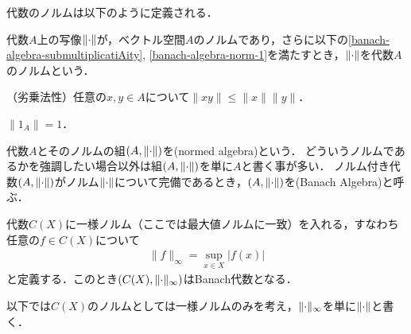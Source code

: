 \documentclass[../main.tex]{subfiles}
\begin{document}
\noindent 代数のノルムは以下のように定義される．

\begin{thmbox}
\begin{definition}
代数\(A\)上の写像\(\lVert\mathord{\cdot}\rVert\)が，ベクトル空間\(A\)のノルムであり，さらに以下の\ref{banach-algebra-submultiplicatiAity}, \ref{banach-algebra-norm-1}を満たすとき，\(\lVert\mathord{\cdot}\rVert\)を代数\(A\)のノルムという．
\begin{conditions}
    \item\label{banach-algebra-submultiplicatiAity}（劣乗法性）任意の\(x, y \in A\)について\(\lVert xy \rVert \leq \lVert x \rVert \lVert y \rVert\)．
    \item\label{banach-algebra-norm-1} \(\lVert 1_A \rVert = 1\)．
\end{conditions}
代数\(A\)とそのノルムの組\((A, \lVert\mathord{\cdot}\rVert)\)を(normed algebra)という．
どういうノルムであるかを強調したい場合以外は組\((A, \lVert \mathord{\cdot} \rVert)\)を単に\(A\)と書く事が多い．
ノルム付き代数\((A, \lVert \mathord{\cdot} \rVert)\)がノルム\(\lVert \mathord{\cdot} \rVert\)について完備であるとき，\((A, \lVert \mathord{\cdot} \rVert)\)を(Banach Algebra)と呼ぶ．
\end{definition}
\end{thmbox}

\begin{thmbox}
\begin{proposition}
代数\(C(X)\)に一様ノルム（ここでは最大値ノルムに一致）を入れる，すなわち任意の\(f \in C(X)\)について
\begin{align*}
    \lVert f \rVert_\infty = \sup_{x \in X} |f(x)|
\end{align*}
と定義する．このとき\((C(X), \lVert \mathord{\cdot} \rVert_\infty)\)はBanach代数となる．
\end{proposition}
\end{thmbox}

\noindent 以下では\(C(X)\)のノルムとしては一様ノルムのみを考え，\(\lVert \mathord{\cdot} \rVert_\infty\)を単に\(\lVert \mathord{\cdot} \rVert\)と書く．
\end{document}
